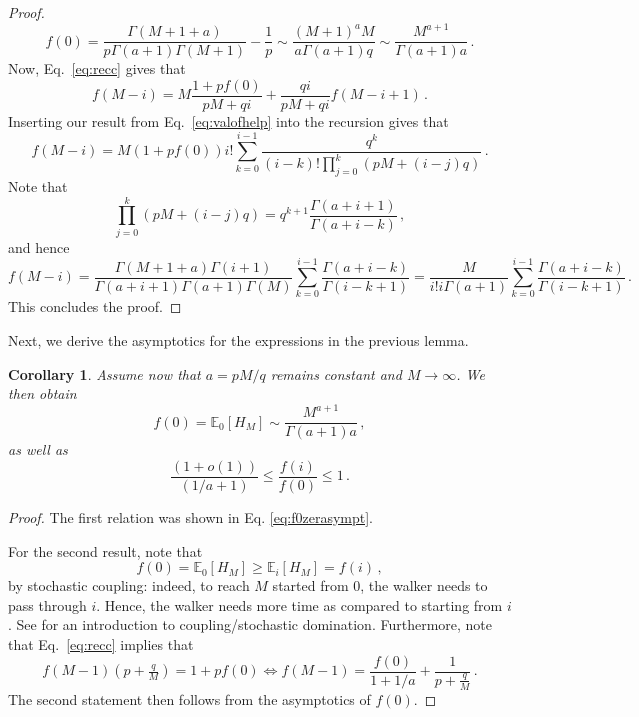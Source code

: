 \documentclass{article}
\numberwithin{equation}{section}
\newcommand{\ek}[1]{\left[#1\right]}
\newcommand{\rk}[1]{\left(#1\right)}
\newcommand{\E}     {\mathbb{E}}
\newcommand{\1}{\mathbbm{1}}
\newtheorem{corollary}[lemma]{Corollary}
\begin{document}
\begin{proof}
\begin{equation}\label{eq:f0zerasympt}
    f(0)=\frac{\Gamma\rk{M+1+a}}{p\Gamma(a+1)\Gamma(M+1)}-\frac{1}{p}\sim \frac{(M+1)^aM}{a\Gamma(a+1)q}\sim \frac{M^{a+1}}{\Gamma(a+1)a}\, .
\end{equation}
Now, Eq.~\eqref{eq:recc} gives that
\begin{equation}
    f(M-i)=M\frac{1+pf(0)}{pM+qi}+\frac{qi}{pM+qi}f(M-i+1)\, .
\end{equation}
Inserting our result from Eq.~\eqref{eq:valofhelp} into the recursion gives that
\begin{equation}
    f(M-i)=M(1+pf(0))i!\sum_{k=0}^{i-1}\frac{q^{k}}{(i-k)!\prod_{j=0}^{k}\rk{pM+(i-j)q}}\, .
\end{equation}
Note that
\begin{equation}
    \prod_{j=0}^{k}\rk{pM+(i-j)q}=q^{k+1}\frac{\Gamma(a+i+1)}{\Gamma(a+i-k)}\, ,
\end{equation}
and hence
\begin{equation}
    f(M-i)=\frac{\Gamma(M+1+a)\Gamma(i+1)}{\Gamma(a+i+1)\Gamma(a+1)\Gamma(M)}\sum_{k=0}^{i-1}\frac{\Gamma(a+i-k)}{\Gamma(i-k+1)} =\frac{M}{i!i\Gamma(a+1)}\sum_{k=0}^{i-1}\frac{\Gamma(a+i-k)}{\Gamma(i-k+1)}\, .
\end{equation}
This concludes the proof.
\end{proof}
Next, we derive the asymptotics for the expressions in the previous lemma.
\begin{corollary}\label{cor:singleCol}
    Assume now that $a=pM/q$ remains constant and $M\to\infty$. We then obtain
    \begin{equation}
        f(0)=\E_0\ek{H_M}\sim \frac{M^{a+1}}{\Gamma(a+1)a}\, ,
    \end{equation}
    as well as
\begin{equation}\label{eq:montf}
    \frac{(1+o(1))}{(1/a+1)}\le \frac{f(i)}{f(0)}\le 1\, .
\end{equation}
\end{corollary}
\begin{proof}
    The first relation was shown in Eq. \eqref{eq:f0zerasympt}. 
    
    For the second result, note that
    \begin{equation}
        f(0)=\E_0\ek{H_M}\ge \E_i\ek{H_M}=f(i)\, ,
    \end{equation}
    by stochastic coupling: indeed, to reach $M$ started from $0$, the walker needs to pass through $i$. Hence, the walker needs more time as compared to starting from $i$. See \cite{lindvall2002lectures} for an introduction to coupling/stochastic domination. Furthermore, note that Eq.~\eqref{eq:recc} implies that
    \begin{equation}
        f(M-1)\rk{p+\tfrac{q}{M}}=1+pf(0)\Longleftrightarrow f(M-1)=\frac{f(0)}{1+1/a}+\frac{1}{p+\tfrac{q}{M}}\, .
    \end{equation}
    The second statement then follows from the asymptotics of $f(0)$.
\end{proof}
\end{document}
